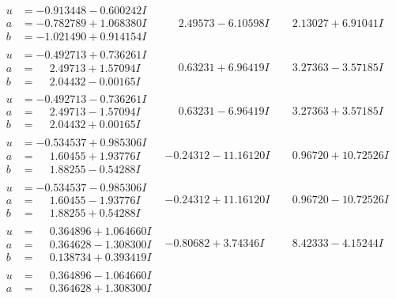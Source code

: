 \documentclass[1p]{elsarticle_modified}
\theoremstyle{definition}
\begin{document}
$$\begin{array}{c|c|c}
\begin{aligned}
u &= -0.913448 - 0.600242 I \\
a &= -0.782789 + 1.068380 I \\
b &= -1.021490 + 0.914154 I\end{aligned}
 & \phantom{-}2.49573 - 6.10598 I & \phantom{-}2.13027 + 6.91041 I \\ \hline\begin{aligned}
u &= -0.492713 + 0.736261 I \\
a &= \phantom{-}2.49713 + 1.57094 I \\
b &= \phantom{-}2.04432 - 0.00165 I\end{aligned}
 & \phantom{-}0.63231 + 6.96419 I & \phantom{-}3.27363 - 3.57185 I \\ \hline\begin{aligned}
u &= -0.492713 - 0.736261 I \\
a &= \phantom{-}2.49713 - 1.57094 I \\
b &= \phantom{-}2.04432 + 0.00165 I\end{aligned}
 & \phantom{-}0.63231 - 6.96419 I & \phantom{-}3.27363 + 3.57185 I \\ \hline\begin{aligned}
u &= -0.534537 + 0.985306 I \\
a &= \phantom{-}1.60455 + 1.93776 I \\
b &= \phantom{-}1.88255 - 0.54288 I\end{aligned}
 & -0.24312 - 11.16120 I & \phantom{-}0.96720 + 10.72526 I \\ \hline\begin{aligned}
u &= -0.534537 - 0.985306 I \\
a &= \phantom{-}1.60455 - 1.93776 I \\
b &= \phantom{-}1.88255 + 0.54288 I\end{aligned}
 & -0.24312 + 11.16120 I & \phantom{-}0.96720 - 10.72526 I \\ \hline\begin{aligned}
u &= \phantom{-}0.364896 + 1.064660 I \\
a &= \phantom{-}0.364628 - 1.308300 I \\
b &= \phantom{-}0.138734 + 0.393419 I\end{aligned}
 & -0.80682 + 3.74346 I & \phantom{-}8.42333 - 4.15244 I \\ \hline\begin{aligned}
u &= \phantom{-}0.364896 - 1.064660 I \\
a &= \phantom{-}0.364628 + 1.308300 I \\

\end{aligned}
\end{array}$$
\end{document}
